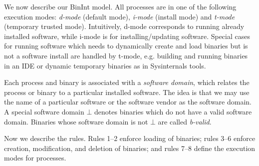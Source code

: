 We now describe our BinInt model.
All processes are in one of the following execution modes:
{\em d-mode} (default mode), {\em i-mode} (install mode) and
{\em t-mode} (temporary trusted mode).
Intuitively, d-mode corresponds to running already installed software,
while i-mode is for installing/updating software.
Special cases for running software
which needs to dynamically create and load binaries but is not a software
install are handled by t-mode,
e.g. building and running binaries in an IDE
or dynamic temporary binaries as in Sysinternals tools.

Each process and binary is associated with a {\em software domain}, which
relates the process or binary to a particular installed software.
The idea is that we may use the name of a particular software or
the software vendor as the software domain.
A special software domain $\bot$ denotes binaries
which do not have a valid software domain.
Binaries whose software domain is not $\bot$ are called {\em b-valid}.

Now we describe the rules. Rules 1--2 enforce loading of binaries;
rules 3--6 enforce creation, modification, and deletion of binaries;
and rules 7--8 define the execution modes for processes.

